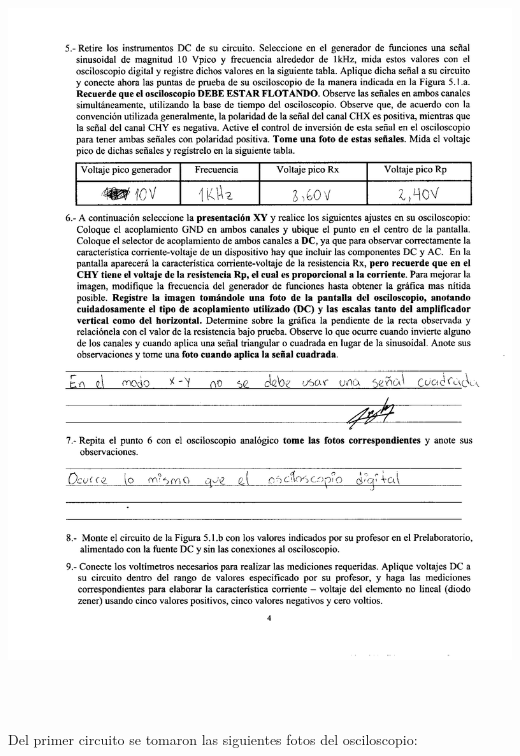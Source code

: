 \documentclass[12pt]{article}
\begin{document}
	\begin{center}
		\includegraphics[width=16cm,height=20cm]{Img/anexo_0002}
	\end{center}
	
	\newpage
	
	\noindent Del primer circuito se tomaron las siguientes fotos del osciloscopio: 
	
\end{document}
